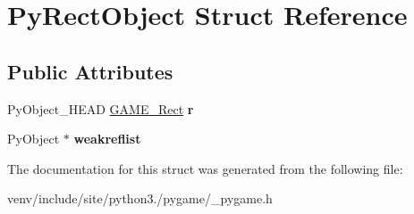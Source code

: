 \hypertarget{struct_py_rect_object}{}\section{Py\+Rect\+Object Struct Reference}
\label{struct_py_rect_object}
\subsection*{Public Attributes}
\begin{DoxyCompactItemize}
\item 
\mbox{\label{struct_py_rect_object_aa0b9cef705b6e9614e9dfef8688dcd5e}} 
Py\+Object\+\_\+\+H\+E\+AD \hyperlink{struct_g_a_m_e___rect}{G\+A\+M\+E\+\_\+\+Rect} {\bfseries r}
\item 
\mbox{\label{struct_py_rect_object_a8531a793907372225343292e2c092284}} 
Py\+Object $\ast$ {\bfseries weakreflist}
\end{DoxyCompactItemize}


The documentation for this struct was generated from the following file\+:\begin{DoxyCompactItemize}
\item 
venv/include/site/python3./pygame/\+\_\+pygame.\+h\end{DoxyCompactItemize}
